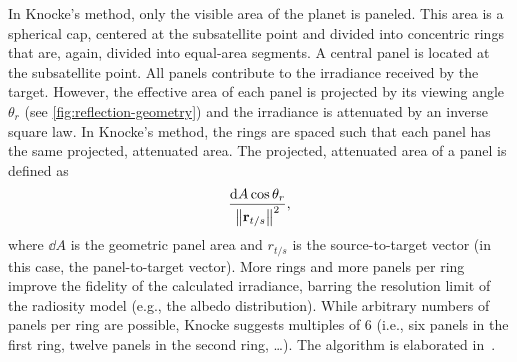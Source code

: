 
In Knocke's method, only the visible area of the planet is paneled. This area is a spherical cap, centered at the subsatellite point and divided into concentric rings that are, again, divided into equal-area segments. A central panel is located at the subsatellite point. All panels contribute to the irradiance received by the target. However, the effective area of each panel is projected by its viewing angle $\theta_r$ (see \cref{fig:reflection-geometry}) and the irradiance is attenuated by an inverse square law. In Knocke's method, the rings are spaced such that each panel has the same projected, attenuated area. The projected, attenuated area of a panel is defined as~\cite{Knocke1988}
\begin{align}
    \frac{\dd{A} \cos \theta_r}{\norm{\vb r_{t/s}}^2},
\end{align}
where $\dd{A}$ is the geometric panel area and $r_{t/s}$ is the source-to-target vector (in this case, the panel-to-target vector). More rings and more panels per ring improve the fidelity of the calculated irradiance, barring the resolution limit of the radiosity model (e.g., the albedo distribution). While arbitrary numbers of panels per ring are possible, Knocke suggests multiples of 6 (i.e., six panels in the first ring, twelve panels in the second ring, \dots). The algorithm is elaborated in~\cite{Knocke1989}.

